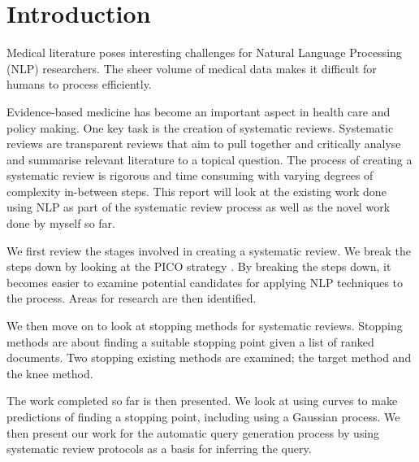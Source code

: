 \chapter{Introduction}

Medical literature poses interesting challenges for Natural Language Processing (NLP) researchers. The sheer volume of medical data makes it difficult for humans to process efficiently.

Evidence-based medicine has become an important aspect in health care and policy making. One key task is the creation of systematic reviews. Systematic reviews are transparent reviews that aim to pull together and critically analyse and summarise relevant literature to a topical question. The process of creating a systematic review is rigorous and time consuming with varying degrees of complexity in-between steps. This report will look at the existing  work done using NLP as part of the systematic review process as well as the novel work done by myself so far.

We first review the stages involved in creating a systematic review. We break the steps down by looking at the PICO strategy \cite{pico}. By breaking the steps down, it becomes easier to examine potential candidates for applying NLP techniques to the process. Areas for research are then identified.

We then move on to look at stopping methods for systematic reviews. Stopping methods are about finding a suitable stopping point given a list of ranked documents. Two stopping existing methods are examined; the target method and the knee method. 

The work completed so far is then presented. We look at using curves to make predictions of finding a stopping point, including using a Gaussian process. We then present our work for the automatic query generation process by using systematic review protocols as a basis for inferring the query.


